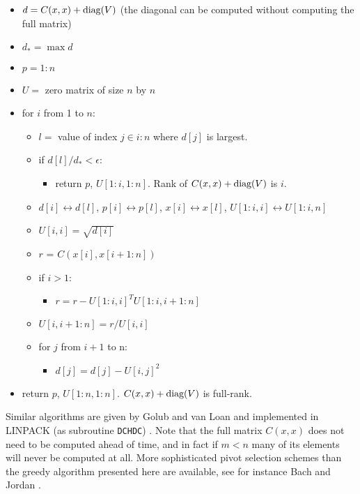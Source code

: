 \documentclass{report}
\begin{document}
\begin{itemize}
    \item $d = C(x,x)+\textup{diag}(V)$ (the diagonal can be computed without computing the full matrix)
    \item $d_* = \max d$
    \item $p=1:n$
    \item $U=$ zero matrix of size $n$ by $n$
    \item for $i$ from 1 to $n$:
    \begin{itemize}
        \item $l=$ value of index $j\in i:n$ where $d[j]$ is largest.
        \item if $d[l] / d_*<\epsilon$:
        \begin{itemize}
            \item return $p$, $U[1:i, 1:n]$. Rank of $C(x,x) + \textup{diag}(V)$ is $i$.
        \end{itemize}
        \item $d[i] \leftrightarrow d[l]$, $p[i] \leftrightarrow p[l]$, $x[i] \leftrightarrow x[l]$, $U[1:i,i] \leftrightarrow U[1:i,n]$
        \item $U[i,i]=\sqrt {d[i]}$
        \item $r$ = $C(x[i], x[i+1:n])$
        \item if $i>1$:
        \begin{itemize}
            \item $r=r-U[1:i,i]^T U[1:i,i+1:n]$
        \end{itemize}
        \item $U[i,i+1:n] = r / U[i,i]$
        \item for $j$ from $i+1$ to n:
        \begin{itemize}
            \item $d[j] = d[j] - U[i,j]^2$
        \end{itemize}
    \end{itemize}
    \item return $p$, $U[1:n, 1:n]$. $C(x,x) + \textup{diag}(V)$ is full-rank.
\end{itemize}
Similar algorithms are given by Golub and van Loan \cite{golub} and implemented in LINPACK (as subroutine \texttt{DCHDC}) \cite{Linpack}. Note that the full matrix $C(x,x)$ does not need to be computed ahead of time, and in fact if $m<n$ many of its elements will never be computed at all. More sophisticated pivot selection schemes than the greedy algorithm presented here are available, see for instance Bach and Jordan \cite{predictivechol}. 
\end{document}
